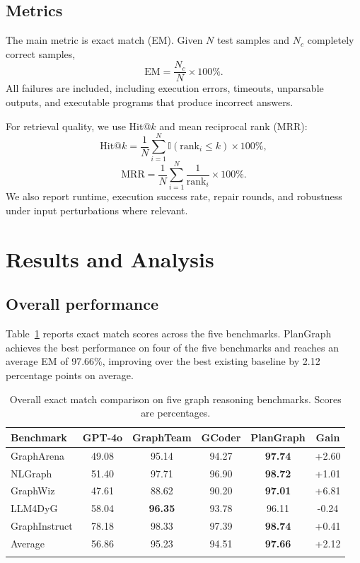 \documentclass[pdflatex,iicol,sn-mathphys-num]{sn-jnl}
\theoremstyle{thmstyleone}
\theoremstyle{thmstyletwo}
\theoremstyle{thmstylethree}
\begin{document}
\subsection{Metrics}

The main metric is exact match (EM). Given $N$ test samples and $N_c$ completely correct samples,
\begin{equation}
\mathrm{EM}=\frac{N_c}{N}\times 100\%.
\end{equation}
All failures are included, including execution errors, timeouts, unparsable outputs, and executable programs that produce incorrect answers.

For retrieval quality, we use Hit@$k$ and mean reciprocal rank (MRR):
\begin{equation}
\mathrm{Hit@}k=\frac{1}{N}\sum_{i=1}^{N}\mathbb{I}(\mathrm{rank}_i \leq k)\times 100\%,
\end{equation}
\begin{equation}
\mathrm{MRR}=\frac{1}{N}\sum_{i=1}^{N}\frac{1}{\mathrm{rank}_i}\times 100\%.
\end{equation}
We also report runtime, execution success rate, repair rounds, and robustness under input perturbations where relevant.

\section{Results and Analysis}\label{sec:results}

\subsection{Overall performance}

Table~\ref{tab:overall} reports exact match scores across the five benchmarks. PlanGraph achieves the best performance on four of the five benchmarks and reaches an average EM of 97.66\%, improving over the best existing baseline by 2.12 percentage points on average.

\begin{table}[t]
\caption{Overall exact match comparison on five graph reasoning benchmarks. Scores are percentages.}
\label{tab:overall}
\begin{tabular}{@{}lccccc@{}}
\toprule
Benchmark & GPT-4o & GraphTeam & GCoder & PlanGraph & Gain \\
\midrule
GraphArena & 49.08 & 95.14 & 94.27 & \textbf{97.74} & +2.60 \\
NLGraph & 51.40 & 97.71 & 96.90 & \textbf{98.72} & +1.01 \\
GraphWiz & 47.61 & 88.62 & 90.20 & \textbf{97.01} & +6.81 \\
LLM4DyG & 58.04 & \textbf{96.35} & 93.78 & 96.11 & -0.24 \\
GraphInstruct & 78.18 & 98.33 & 97.39 & \textbf{98.74} & +0.41 \\
\midrule
Average & 56.86 & 95.23 & 94.51 & \textbf{97.66} & +2.12 \\
\botrule
\end{tabular}
\end{table}
\end{document}
